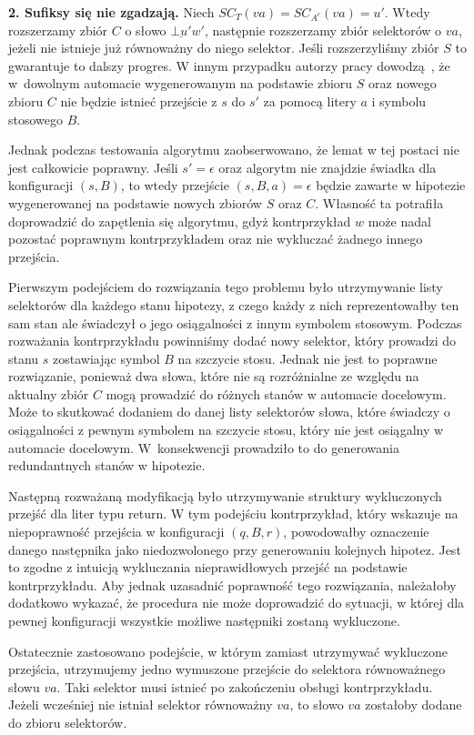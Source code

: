\textbf{2. Sufiksy się nie zgadzają.} Niech $SC_T(va) = SC_{A^c}(va) = u'$. Wtedy rozszerzamy zbiór $C$ o słowo $\underline{\bot u'}w'$,
następnie rozszerzamy zbiór selektorów o $va$, jeżeli nie istnieje już równoważny do niego selektor.
Jeśli rozszerzyliśmy zbiór $S$ to gwarantuje to dalszy progres. W innym przypadku autorzy pracy dowodzą~\cite[Lemma 16]{main},
że w~dowolnym automacie wygenerowanym na podstawie zbioru $S$ oraz nowego zbioru $C$ nie będzie istnieć przejście z $s$ do $s'$ za pomocą
litery $a$ i symbolu stosowego $B$.

Jednak podczas testowania algorytmu zaobserwowano, że lemat w tej postaci nie jest całkowicie poprawny. Jeśli $s' = \epsilon$ oraz algorytm nie znajdzie
świadka dla konfiguracji $(s, B)$, to wtedy przejście $(s, B, a) = \epsilon$ będzie zawarte w hipotezie wygenerowanej na podstawie nowych
zbiorów $S$ oraz $C$. Własność ta potrafiła doprowadzić do zapętlenia się algorytmu, gdyż kontrprzykład $w$
może nadal pozostać poprawnym kontrprzykładem oraz nie wykluczać żadnego innego przejścia.

Pierwszym podejściem do rozwiązania tego problemu było utrzymywanie listy selektorów dla każdego stanu hipotezy, z czego każdy z nich reprezentowałby
ten sam stan ale świadczył o jego osiągalności z innym symbolem stosowym. Podczas rozważania kontrprzykładu powinniśmy dodać nowy selektor,
który prowadzi do stanu $s$ zostawiając symbol $B$ na szczycie stosu. Jednak nie jest to poprawne rozwiązanie,
ponieważ dwa słowa, które nie są rozróżnialne ze względu na aktualny zbiór $C$ mogą prowadzić do różnych stanów w automacie docelowym. Może to skutkować
dodaniem do danej listy selektorów słowa, które świadczy o osiągalności z pewnym symbolem na szczycie stosu, który nie jest osiągalny w automacie docelowym.
W~konsekwencji prowadziło to do generowania redundantnych stanów w hipotezie.

Następną rozważaną modyfikacją było utrzymywanie struktury wykluczonych przejść dla liter typu return.
W tym podejściu kontrprzykład, który wskazuje na niepoprawność przejścia w konfiguracji $(q, B, r)$,
powodowałby oznaczenie danego następnika jako niedozwolonego przy generowaniu kolejnych hipotez.
Jest to zgodne z intuicją wykluczania nieprawidłowych przejść na podstawie kontrprzykładu.
Aby jednak uzasadnić poprawność tego rozwiązania, należałoby dodatkowo wykazać, że procedura nie może
doprowadzić do sytuacji, w której dla pewnej konfiguracji wszystkie możliwe następniki zostaną wykluczone.

Ostatecznie zastosowano podejście, w którym zamiast utrzymywać wykluczone przejścia,
utrzymujemy jedno wymuszone przejście do selektora równoważnego słowu $va$. Taki selektor musi
istnieć po zakończeniu obsługi kontrprzykładu. Jeżeli wcześniej nie istniał selektor równoważny $va$,
to słowo $va$ zostałoby dodane do zbioru selektorów.

